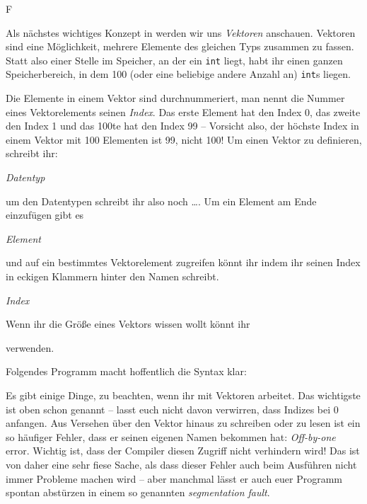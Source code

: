 F

Als nächstes wichtiges Konzept in \Cpp werden wir uns \emph{Vektoren} anschauen.
Vektoren sind eine Möglichkeit, mehrere Elemente des gleichen Typs zusammen zu fassen.
Statt also einer Stelle im Speicher, an der ein \texttt{int} liegt, habt ihr einen ganzen Speicherbereich, in dem 100 (oder eine beliebige andere Anzahl an) \texttt{int}s liegen.

Die Elemente in einem Vektor sind durchnummeriert, man nennt die Nummer eines Vektorelements seinen \emph{Index}.
Das erste Element hat den Index 0, das zweite den Index 1 und das 100te hat den Index 99 -- Vorsicht also, der höchste Index in einem Vektor mit 100 Elementen ist 99, nicht 100!
Um einen Vektor zu definieren, schreibt ihr:
\begin{center}
\emph{Datentyp}
\end{center}
um den Datentypen schreibt ihr also noch \dots\cppinline{>}.
Um ein Element am Ende einzufügen gibt es
\begin{center}
\emph{Element}\cppinline{);}
\end{center}
und auf ein bestimmtes Vektorelement zugreifen könnt ihr indem ihr seinen Index in eckigen Klammern hinter den Namen schreibt.
\begin{center}
\cppinline{einvektor[}\emph{Index}\cppinline{]}
\end{center}
Wenn ihr die Größe eines Vektors wissen wollt könnt ihr
\begin{center}
\end{center}
verwenden.

Folgendes Programm macht hoffentlich die Syntax klar:


Es gibt einige Dinge, zu beachten, wenn ihr mit Vektoren arbeitet.
Das wichtigste ist oben schon genannt -- lasst euch nicht davon verwirren, dass Indizes bei 0 anfangen.
Aus Versehen über den Vektor hinaus zu schreiben oder zu lesen ist ein so häufiger Fehler, dass er seinen eigenen Namen bekommen hat: \emph{Off-by-one} error.
Wichtig ist, dass der Compiler diesen Zugriff nicht verhindern wird!
Das ist von daher eine sehr fiese Sache, als dass dieser Fehler auch beim Ausführen nicht immer Probleme machen wird -- aber manchmal lässt er auch euer Programm spontan abstürzen in einem so genannten \emph{segmentation fault}.

